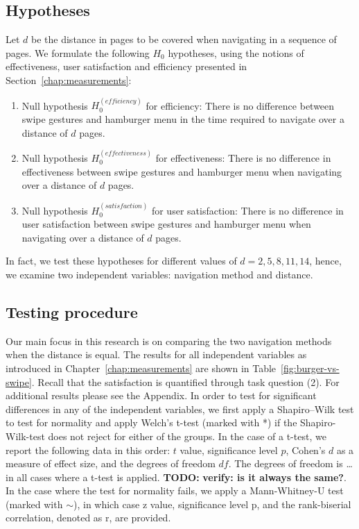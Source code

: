 \documentclass{sig-alternate-05-2015}
\newcommand{\todo}{\textbf{TODO:} \textbf}
\begin{document}
\subsection{Hypotheses}
Let $d$ be the distance in pages to be covered when navigating in a sequence of pages. We formulate the following $H_0$ hypotheses, using the notions
of effectiveness, user satisfaction and efficiency presented in Section~\ref{chap:measurements}:
\begin{enumerate}
	\item Null hypothesis $H_0^{(efficiency)}$ for efficiency:
	There is no difference between swipe gestures and hamburger menu in the
	time required to navigate over a distance of $d$ pages.
	\item Null hypothesis $H_0^{(effectiveness)}$ for effectiveness: There is no
	difference in effectiveness between swipe gestures and hamburger menu
	when navigating over a distance of $d$ pages.
	\item Null hypothesis $H_0^{(satisfaction)}$ for user satisfaction: There is no
	difference in user satisfaction between swipe gestures and hamburger menu
	when navigating over a distance of $d$ pages.
\end{enumerate}

In fact, we test these hypotheses for different values of $d = 2, 5, 8, 11, 14$, hence, we
examine two independent variables: navigation method and distance.

\subsection{Testing procedure}
Our main focus in this research is on comparing the two navigation methods when the distance is equal.
The results for all independent variables as introduced in Chapter~\ref{chap:measurements} are shown in Table~\ref{fig:burger-vs-swipe}. Recall that the
satisfaction is quantified through task question (2). For additional results please see the Appendix.
In order to test for significant differences in any of the independent variables, we first apply a Shapiro–Wilk test to 
test for normality and apply Welch's t-test (marked with *) if the Shapiro-Wilk-test does not reject for either of the groups.
In the case of a t-test, we report the following data in this order: $t$ value, significance level $p$, Cohen's $d$ as a measure of effect size, and the degrees of
freedom $df$. 
The degrees of freedom is \ldots in all cases where a t-test is applied. \todo{verify: is it always the same?}.
In the case where the test for normality fails, we apply a Mann-Whitney-U test (marked with $\sim$), in which case z value, significance level p, and
the rank-biserial correlation, denoted as r, are provided.
\end{document}
